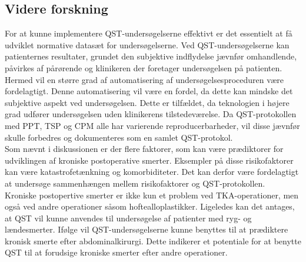 \subsection{Videre forskning}
For at kunne implementere QST-undersøgelserne effektivt er det essentielt at få udviklet normative datasæt for undersøgelserne.  Ved QST-undersøgelserne kan patienternes resultater, grundet den subjektive indflydelse jævnfør  omhandlende, påvirkes af pårørende og klinikeren der foretager undersøgelsen på patienten. Hermed vil en større grad af automatisering af undersøgelsesproceduren være fordelagtigt. Denne automatisering vil være en fordel, da dette kan mindske det subjektive aspekt ved undersøgelsen. Dette er tilfældet, da teknologien i højere grad udfører undersøgelsen uden klinikerens tilstedeværelse. Da QST-protokollen med PPT, TSP og CPM  alle har varierende reproducerbarheder, vil disse jævnfør  skulle forbedres og dokumenteres som en samlet QST-protokol. \\
Som nævnt i diskussionen er der flere faktorer, som kan være prædiktorer for udviklingen af kroniske postoperative smerter. Eksempler på disse risikofaktorer kan være katastrofetænkning og komorbiditeter. Det kan derfor være fordelagtigt at undersøge sammenhængen mellem risikofaktorer og QST-protokollen.\\
Kroniske postopertive smerter er ikke kun et problem ved TKA-operationer, men også ved andre operationer såsom hoftealloplastikker. \citep{Suokas2012} Ligeledes kan det antages, at QST vil kunne anvendes til undersøgelse af patienter med ryg- og lændesmerter. Ifølge  vil QST-undersøgelserne kunne benyttes til at prædiktere kronisk smerte efter abdominalkirurgi. Dette indikerer et potentiale for at benytte QST til at forudsige kroniske smerter efter andre operationer.